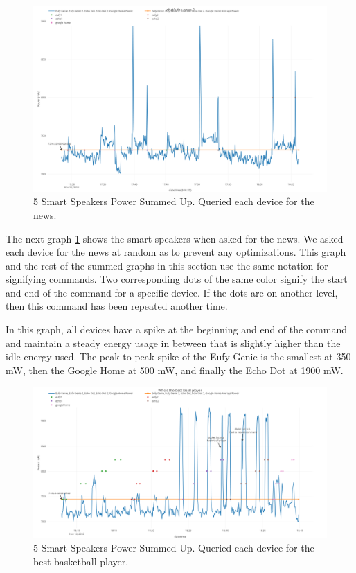 \begin{figure}[H]
  \centering
  \includegraphics[width=1\textwidth]{figures/mixedNewsSum.png}
  \caption{5 Smart Speakers Power Summed Up. Queried each device for the
  news.}
  \label{fig:mixedNewsSum}
\end{figure}

The next graph \ref{fig:mixedNewsSum} shows the smart speakers when asked for the news. We asked each device for the news at random as to prevent any optimizations. This graph and the rest of the summed graphs in this section use the same notation for signifying commands. Two corresponding dots of the same color signify the start and end of the command for a specific device. If the dots are on another level, then this command has been repeated another time.

In this graph, all devices have a spike at the beginning and end of the command and maintain a steady energy usage in between that is slightly higher than the idle energy used. The peak to peak spike of the Eufy Genie is the smallest at 350 mW, then the Google Home at 500 mW, and finally the Echo Dot at 1900 mW.

\begin{figure}[H]
  \centering
  \includegraphics[width=1\textwidth]{figures/bestBballSum.png}
  \caption{5 Smart Speakers Power Summed Up. Queried each device for the
  best basketball player.}
  \label{fig:bestBballSum}
\end{figure}

